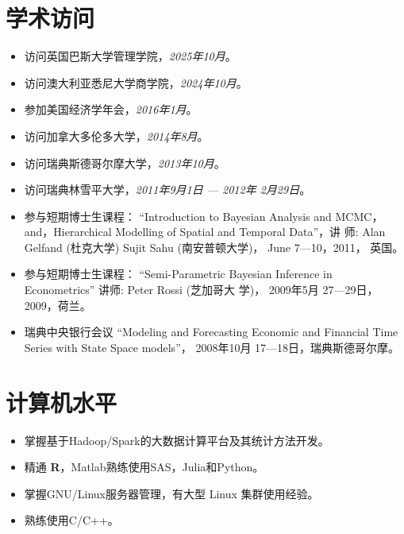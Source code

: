 \documentclass[twoside,a4paper,11pt]{article}
\begin{document}
\section{学术访问}

\begin{itemize}
\item 访问英国巴斯大学管理学院，\emph{2025年10月}。
\item 访问澳大利亚悉尼大学商学院，\emph{2024年10月}。
\item 参加美国经济学年会，\emph{2016年1月}。
\item 访问加拿大多伦多大学，\emph{2014年8月}。
\item 访问瑞典斯德哥尔摩大学，\emph{2013年10月}。

\item 访问瑞典林雪平大学，\emph{2011年9月1日 --- 2012年 2月29日}。

\item 参与短期博士生课程： ``Introduction to Bayesian Analysis and
  MCMC， and，Hierarchical Modelling of Spatial and Temporal Data''，讲
  师: Alan Gelfand (杜克大学) Sujit Sahu (南安普顿大学)， June
  7---10，2011， 英国。

\item 参与短期博士生课程： ``Semi-Parametric Bayesian Inference in
  Econometrics'' 讲师: Peter Rossi (芝加哥大
  学)， 2009年5月 27---29日，2009，荷兰。

\item 瑞典中央银行会议 ``Modeling and Forecasting Economic and
  Financial Time Series with State Space
  models''， 2008年10月 17---18日，瑞典斯德哥尔摩。
\end{itemize}

\section{计算机水平}
\begin{itemize}

\item 掌握基于Hadoop/Spark的大数据计算平台及其统计方法开发。

\item  精通 \textbf{R}，Matlab熟练使用SAS，Julia和Python。

\item  掌握GNU/Linux服务器管理，有大型 Linux 集群使用经验。

\item  熟练使用C/C++。
\end{itemize}
\end{document}
